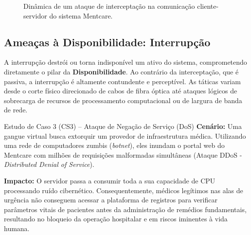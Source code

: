 \documentclass[12pt,a4paper,twoside]{report}
\begin{document}
\begin{figure}[h]
    \centering
    \caption{Dinâmica de um ataque de interceptação na comunicação cliente-servidor do sistema Mentcare.}
    \label{fig:mentcare_intercptacao}
\end{figure}

\subsection{Ameaças à Disponibilidade: Interrupção}
A interrupção destrói ou torna indisponível um ativo do sistema, comprometendo diretamente o pilar da \textbf{Disponibilidade}. Ao contrário da interceptação, que é passiva, a interrupção é altamente contundente e perceptível. As táticas variam desde o corte físico direcionado de cabos de fibra óptica até ataques lógicos de sobrecarga de recursos de processamento computacional ou de largura de banda de rede.

\begin{block}{Estudo de Caso 3 (CS3) – Ataque de Negação de Serviço (DoS)}
\textbf{Cenário:} Uma gangue virtual busca extorquir um provedor de infraestrutura médica. Utilizando uma rede de computadores zumbis (\textit{botnet}), eles inundam o portal web do Mentcare com milhões de requisições malformadas simultâneas (Ataque DDoS - \textit{Distributed Denial of Service}).

\textbf{Impacto:} O servidor passa a consumir toda a sua capacidade de CPU processando ruído cibernético. Consequentemente, médicos legítimos nas alas de urgência não conseguem acessar a plataforma de registros para verificar parâmetros vitais de pacientes antes da administração de remédios fundamentais, resultando no bloqueio da operação hospitalar e em riscos iminentes à vida humana.
\end{block}
\end{document}
